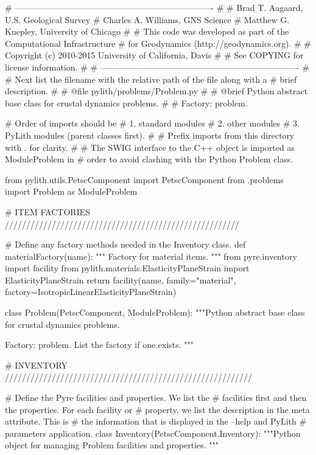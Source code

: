 \begin{python}
# ----------------------------------------------------------------------
#
# Brad T. Aagaard, U.S. Geological Survey
# Charles A. Williams, GNS Science
# Matthew G. Knepley, University of Chicago
#
# This code was developed as part of the Computational Infrastructure
# for Geodynamics (http://geodynamics.org).
#
# Copyright (c) 2010-2015 University of California, Davis
#
# See COPYING for license information.
#
# ----------------------------------------------------------------------
# 
# Next list the filename with the relative path of the file along with a
# brief description.
#  
# @file pylith/problems/Problem.py
#
# @brief Python abstract base class for crustal dynamics problems.
#
# Factory: problem.

# Order of imports should be
# 1. standard modules
# 2. other modules
# 3. PyLith modules (parent classes first).
#
# Prefix imports from this directory with . for clarity.
#  
# The SWIG interface to the C++ object is imported as ModuleProblem in
# order to avoid clashing with the Python Problem class.

from pylith.utils.PetscComponent import PetscComponent
from .problems import Problem as ModuleProblem

# ITEM FACTORIES ///////////////////////////////////////////////////////

# Define any factory methods needed in the Inventory class.
def materialFactory(name):
    """
    Factory for material items.
    """
    from pyre.inventory import facility
    from pylith.materials.ElasticityPlaneStrain import ElasticityPlaneStrain
    return facility(name, family="material", factory=IsotropicLinearElasticityPlaneStrain)

class Problem(PetscComponent, ModuleProblem):
    """Python abstract base class for crustal dynamics problems.

    Factory: problem. List the factory if one exists.
    """

    # INVENTORY //////////////////////////////////////////////////////////

    # Define the Pyre facilities and properties. We list the
    # facilities first and then the properties. For each facility or
    # property, we list the description in the meta attribute. This is
    # the information that is displayed in the --help and PyLith
    # parameters application.
    class Inventory(PetscComponent.Inventory):
        """Python object for managing Problem facilities and properties.
        """


\end{python}
